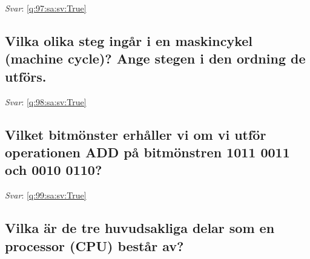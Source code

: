 \documentclass[a4paper,11pt,oneside]{article}
\begin{document}
\begin{sloppypar}
\label{q:97:sa:sv:False}

\vspace{2cm}

\noindent\makebox[\textwidth]{\hrulefill}

\vspace{1cm}

\textit{Svar}: \autoref{q:97:sa:sv:True}



\subsection{Vilka olika steg ing\r{a}r i en maskincykel (machine cycle)? Ange stegen i den ordning de utf\"ors.}

\label{q:98:sa:sv:False}

\vspace{2cm}

\noindent\makebox[\textwidth]{\hrulefill}

\vspace{1cm}

\textit{Svar}: \autoref{q:98:sa:sv:True}



\subsection{Vilket bitm\"onster erh\r{a}ller vi om vi utf\"or operationen ADD p\r{a} bitm\"onstren 1011 0011 och 0010 0110?}

\label{q:99:sa:sv:False}

\vspace{2cm}

\noindent\makebox[\textwidth]{\hrulefill}

\vspace{1cm}

\textit{Svar}: \autoref{q:99:sa:sv:True}



\subsection{Vilka \"ar de tre huvudsakliga delar som en processor (CPU) best\r{a}r av?}

\label{q:100:sa:sv:False}

\vspace{2cm}

\noindent\makebox[\textwidth]{\hrulefill}

\vspace{1cm}


\end{sloppypar}
\end{document}
